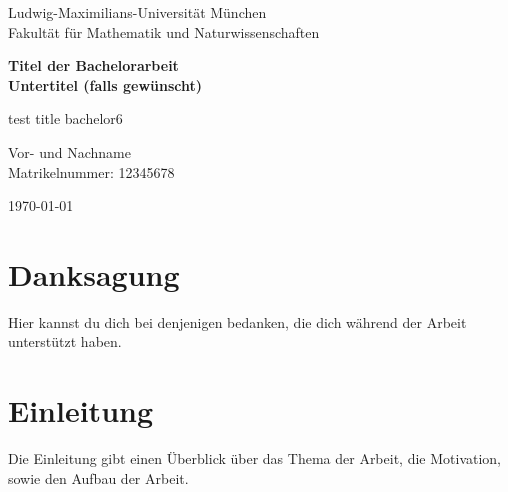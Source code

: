 \documentclass[12pt, reqno, titlepage]{amsart}
\begin{document}
\begin{titlepage}
    \centering
    \vspace*{1.5cm}
    
    {\Large Ludwig-Maximilians-Universität München\\[0.3cm]
    Fakultät für Mathematik und Naturwissenschaften}
    
    \vspace{1.5cm}
    
    {\huge\bfseries Titel der Bachelorarbeit\\[0.4cm]
    \Large Untertitel (falls gewünscht)}
    
    \vspace{2cm}
    
    {\Large test title bachelor6}
    
    \vspace{2cm}
    
    {\Large Vor- und Nachname\\[0.2cm]
    Matrikelnummer: 12345678}
    
    \vfill
    
    {\Large \today}
    
\end{titlepage}






\begin{abstract}
    Hier folgt eine kurze Zusammenfassung der Arbeit. Erläutere in wenigen Sätzen das Thema, die Methodik und die wichtigsten Ergebnisse.
\end{abstract}
\thispagestyle{empty}
\newpage

\section*{Danksagung}
Hier kannst du dich bei denjenigen bedanken, die dich während der Arbeit unterstützt haben. 
\thispagestyle{empty}
\newpage

\tableofcontents
\thispagestyle{empty}
\newpage

\listoffigures
\thispagestyle{empty}
\newpage

\listoftables
\thispagestyle{empty}
\newpage

\section{Einleitung}
Die Einleitung gibt einen Überblick über das Thema der Arbeit, die Motivation, sowie den Aufbau der Arbeit.
\end{document}
